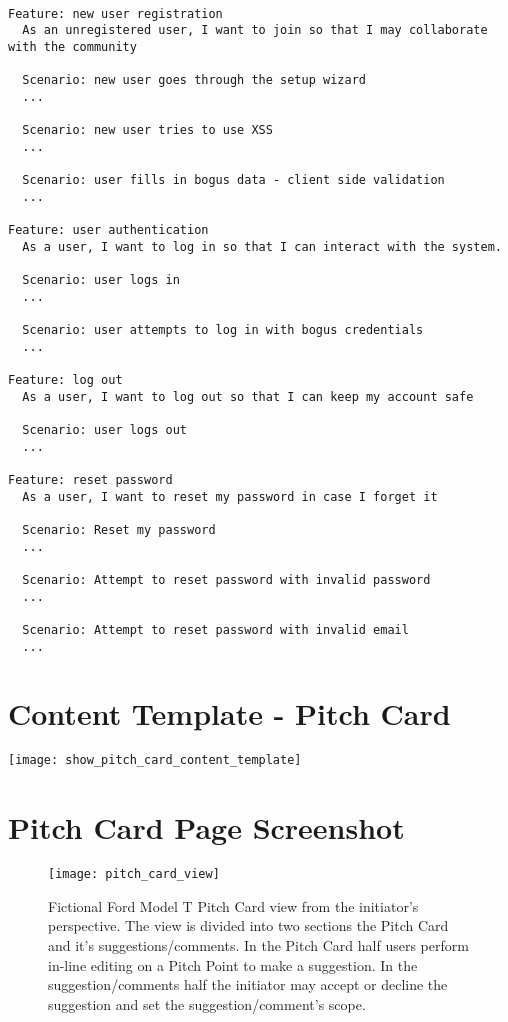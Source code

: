 \begin{verbatim}

Feature: new user registration
  As an unregistered user, I want to join so that I may collaborate with the community

  Scenario: new user goes through the setup wizard
  ...

  Scenario: new user tries to use XSS
  ...

  Scenario: user fills in bogus data - client side validation
  ...

Feature: user authentication
  As a user, I want to log in so that I can interact with the system.

  Scenario: user logs in
  ...

  Scenario: user attempts to log in with bogus credentials
  ...

Feature: log out
  As a user, I want to log out so that I can keep my account safe

  Scenario: user logs out
  ...

Feature: reset password
  As a user, I want to reset my password in case I forget it

  Scenario: Reset my password
  ...

  Scenario: Attempt to reset password with invalid password
  ...
  
  Scenario: Attempt to reset password with invalid email
  ...

\end{verbatim}

\chapter{Content Template - Pitch Card}\label{A:content_template}

\texttt{[image: show\_pitch\_card\_content\_template]}

\chapter{Pitch Card Page Screenshot}\label{A:pitch_card_pitchhub}

\begin{sidewaysfigure}[ht]
    \centering
    \texttt{[image: pitch\_card\_view]}
    \caption{Fictional Ford Model T Pitch Card view from the initiator's perspective. The view is divided into two sections the Pitch Card and it's suggestions/comments. In the Pitch Card half users perform in-line editing on a Pitch Point to make a suggestion. In the suggestion/comments half the initiator may accept or decline the suggestion and set the suggestion/comment's scope.}
\end{sidewaysfigure}

